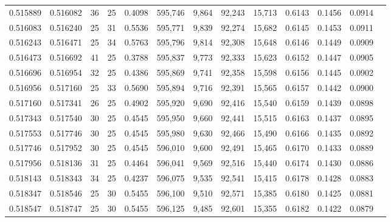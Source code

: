 \begin{tabular}{rrrrrrrrrrrrr}
0.515889 & 0.516082 &    36 &  25 &                                     0.4098 & 595,746 &   9,864 &  92,243 &  15,713 & 0.6143 & 0.1456 & 0.0914 \\
0.516083 & 0.516240 &    25 &  31 &                                     0.5536 & 595,771 &   9,839 &  92,274 &  15,682 & 0.6145 & 0.1453 & 0.0911 \\
0.516243 & 0.516471 &    25 &  34 &                                     0.5763 & 595,796 &   9,814 &  92,308 &  15,648 & 0.6146 & 0.1449 & 0.0909 \\
0.516473 & 0.516692 &    41 &  25 &                                     0.3788 & 595,837 &   9,773 &  92,333 &  15,623 & 0.6152 & 0.1447 & 0.0905 \\
0.516696 & 0.516954 &    32 &  25 &                                     0.4386 & 595,869 &   9,741 &  92,358 &  15,598 & 0.6156 & 0.1445 & 0.0902 \\
0.516956 & 0.517160 &    25 &  33 &                                     0.5690 & 595,894 &   9,716 &  92,391 &  15,565 & 0.6157 & 0.1442 & 0.0900 \\
0.517160 & 0.517341 &    26 &  25 &                                     0.4902 & 595,920 &   9,690 &  92,416 &  15,540 & 0.6159 & 0.1439 & 0.0898 \\
0.517343 & 0.517540 &    30 &  25 &                                     0.4545 & 595,950 &   9,660 &  92,441 &  15,515 & 0.6163 & 0.1437 & 0.0895 \\
0.517553 & 0.517746 &    30 &  25 &                                     0.4545 & 595,980 &   9,630 &  92,466 &  15,490 & 0.6166 & 0.1435 & 0.0892 \\
0.517746 & 0.517952 &    30 &  25 &                                     0.4545 & 596,010 &   9,600 &  92,491 &  15,465 & 0.6170 & 0.1433 & 0.0889 \\
0.517956 & 0.518136 &    31 &  25 &                                     0.4464 & 596,041 &   9,569 &  92,516 &  15,440 & 0.6174 & 0.1430 & 0.0886 \\
0.518143 & 0.518343 &    34 &  25 &                                     0.4237 & 596,075 &   9,535 &  92,541 &  15,415 & 0.6178 & 0.1428 & 0.0883 \\
0.518347 & 0.518546 &    25 &  30 &                                     0.5455 & 596,100 &   9,510 &  92,571 &  15,385 & 0.6180 & 0.1425 & 0.0881 \\
0.518547 & 0.518747 &    25 &  30 &                                     0.5455 & 596,125 &   9,485 &  92,601 &  15,355 & 0.6182 & 0.1422 & 0.0879 \\

\end{tabular}
